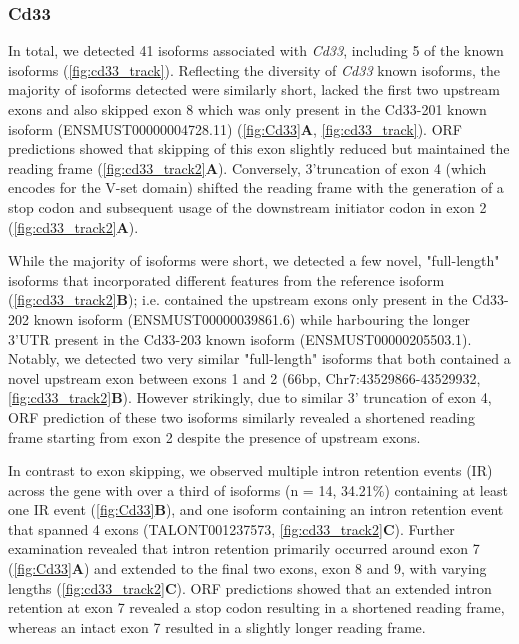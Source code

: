 \subsubsection{Cd33}
In total, we detected 41 isoforms associated with \textit{Cd33}, including 5 of the known isoforms (\cref{fig:cd33_track}). Reflecting the diversity of \textit{Cd33} known isoforms, the majority of isoforms detected were similarly short, lacked the first two upstream exons and also skipped exon 8 which was only present in the Cd33-201 known isoform (ENSMUST00000004728.11) (\cref{fig:Cd33}\textbf{A}, \cref{fig:cd33_track}). ORF predictions showed that skipping of this exon slightly reduced but maintained the reading frame (\cref{fig:cd33_track2}\textbf{A}). Conversely, 3'truncation of exon 4 (which encodes for the V-set domain) shifted the reading frame with the generation of a stop codon and subsequent usage of the downstream initiator codon in exon 2 (\cref{fig:cd33_track2}\textbf{A}).   

While the majority of isoforms were short, we detected a few novel, "full-length" isoforms that incorporated different features from the reference isoform (\cref{fig:cd33_track2}\textbf{B}); i.e. contained the upstream exons only present in the Cd33-202 known isoform (ENSMUST00000039861.6) while harbouring the longer 3'UTR present in the Cd33-203 known isoform (ENSMUST00000205503.1). Notably, we detected two very similar "full-length" isoforms that both contained a novel upstream exon between exons 1 and 2 (66bp, Chr7:43529866-43529932, \cref{fig:cd33_track2}\textbf{B}). However strikingly, due to similar 3' truncation of exon 4, ORF prediction of these two isoforms similarly revealed a shortened reading frame starting from exon 2 despite the presence of upstream exons.  

In contrast to exon skipping, we observed multiple intron retention events (IR) across the gene with over a third of isoforms (n = 14, 34.21\%) containing at least one IR event (\cref{fig:Cd33}\textbf{B}), and one isoform containing an intron retention event that spanned 4 exons (TALONT001237573, \cref{fig:cd33_track2}\textbf{C}). Further examination revealed that intron retention primarily occurred around exon 7 (\cref{fig:Cd33}\textbf{A}) and extended to the final two exons, exon 8 and 9, with varying lengths (\cref{fig:cd33_track2}\textbf{C}). ORF predictions showed that an extended intron retention at exon 7 revealed a stop codon resulting in a shortened reading frame, whereas an intact exon 7 resulted in a slightly longer reading frame.


